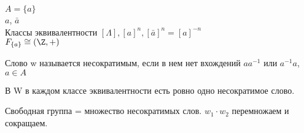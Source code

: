 \begin{exmp}
$A = \{a\}$ \\
$a$, $\bar{a}$\\
Классы эквивалентности 
$[\Lambda], [a]^n, [\bar{a}]^n = [a]^{-n}$\\
$F_{\{a\}} \cong (\Z,+)$\\
\end{exmp}
\begin{Def}
Слово w называется несократимым, если в нем
нет вхождений $aa^{-1}$ или $a^{-1}a$, $a \in A$\\
\end{Def}   
\begin{theorem}
В W в каждом классе эквивалентности есть ровно одно несократимое слово.
\end{theorem}
\begin{Rem}
Свободная группа = множество несократимых слов.
$w_1 \cdot w_2$ перемножаем и сокращаем.
\end{Rem}
